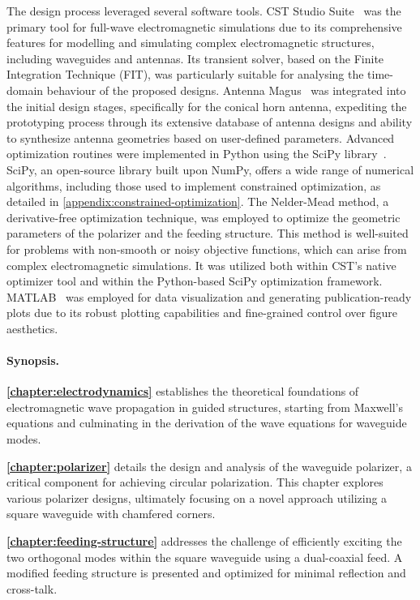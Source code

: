 \documentclass[11pt,a4paper,twoside,openany]{report}
\begin{document}
The design process leveraged several software tools. CST Studio Suite~\parencite{cst} was the primary tool for full-wave electromagnetic simulations due to its comprehensive features for modelling and simulating complex electromagnetic structures, including waveguides and antennas. Its transient solver, based on the Finite Integration Technique (FIT), was particularly suitable for analysing the time-domain behaviour of the proposed designs. Antenna Magus~\parencite{antenna-magus} was integrated into the initial design stages, specifically for the conical horn antenna, expediting the prototyping process through its extensive database of antenna designs and ability to synthesize antenna geometries based on user-defined parameters. Advanced optimization routines were implemented in Python using the SciPy library~\parencite{virtanen-et-al:scipy}. SciPy, an open-source library built upon NumPy, offers a wide range of numerical algorithms, including those used to implement constrained optimization, as detailed in \cref{appendix:constrained-optimization}. The Nelder-Mead method, a derivative-free optimization technique, was employed to optimize the geometric parameters of the polarizer and the feeding structure. This method is well-suited for problems with non-smooth or noisy objective functions, which can arise from complex electromagnetic simulations. It was utilized both within CST's native optimizer tool and within the Python-based SciPy optimization framework. MATLAB~\parencite{matlab} was employed for data visualization and generating publication-ready plots due to its robust plotting capabilities and fine-grained control over figure aesthetics.

\paragraph*{Synopsis.} \textbf{\cref{chapter:electrodynamics}} establishes the theoretical foundations of electromagnetic wave propagation in guided structures, starting from Maxwell's equations and culminating in the derivation of the wave equations for waveguide modes.

\textbf{\cref{chapter:polarizer}} details the design and analysis of the waveguide polarizer, a critical component for achieving circular polarization. This chapter explores various polarizer designs, ultimately focusing on a novel approach utilizing a square waveguide with chamfered corners.

\textbf{\cref{chapter:feeding-structure}} addresses the challenge of efficiently exciting the two orthogonal modes within the square waveguide using a dual-coaxial feed. A modified feeding structure is presented and optimized for minimal reflection and cross-talk.
\end{document}
